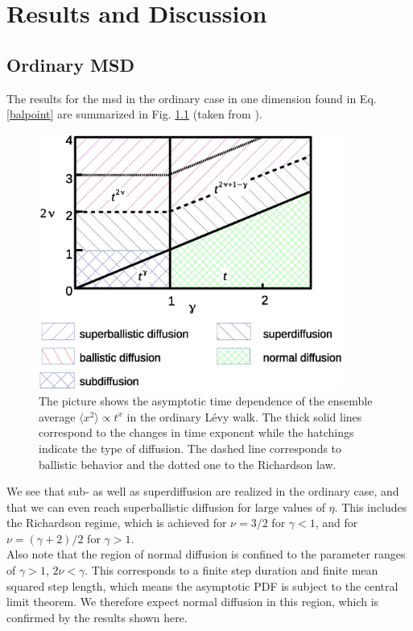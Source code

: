 \chapter{Results and Discussion}

\section{Ordinary MSD}



The results for the \gls*{msd} in the ordinary case in one dimension found in Eq. \ref{balpoint} are summarized in Fig. \ref{fig:resultsMSDordinary} (taken from 
\cite{bothe}).
%
\begin{figure}[htb!]
\begin{center}
\includegraphics[width=100mm]{pics/resultsMSDordinary.eps}
\caption{The picture shows the asymptotic time dependence of the ensemble average $\langle x^2 \rangle \propto t^{x}$ in the ordinary L\'evy walk. The thick solid lines correspond to the changes in time exponent while the hatchings indicate the type of diffusion. The dashed line corresponds to ballistic behavior and the dotted one to the Richardson law.
\label{fig:resultsMSDordinary} }
\end{center}
\end{figure} 
%
We see that sub- as well as superdiffusion are realized in the ordinary case, and that we can even reach superballistic diffusion for large values of $\eta$. This includes the Richardson regime, which is achieved for $\nu = 3/2$ for $\gamma <1$, and for $\nu = (\gamma + 2)/2$ for $\gamma > 1$.\\ Also note that the region of normal diffusion is confined to the parameter ranges of $\gamma>1$, $2\nu < \gamma$. This corresponds to a finite step duration and finite mean squared step length, which means the asymptotic \gls*{PDF} is subject to the central limit theorem. We therefore expect normal diffusion in this region, which is confirmed by the results shown here.

